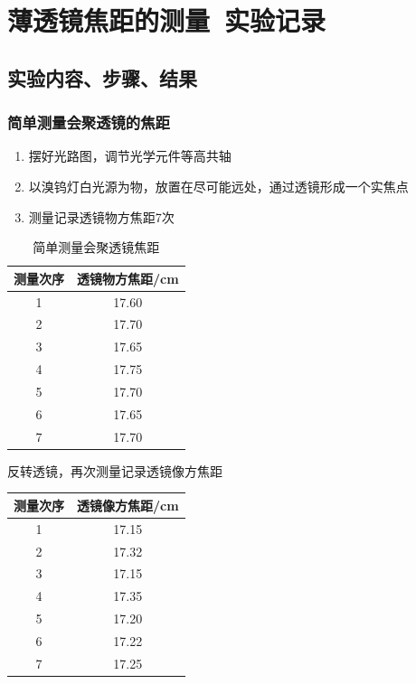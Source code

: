 \documentclass[dvipsnames, svgnames,a4paper,11pt]{article}
\begin{document}
\section{薄透镜焦距的测量\ \textbf{实验记录}}
\subsection{实验内容、步骤、结果}
\subsubsection{简单测量会聚透镜的焦距}
\begin{enumerate}
	\item 摆好光路图，调节光学元件等高共轴
	\item 以溴钨灯白光源为物，放置在尽可能远处，通过透镜形成一个实焦点
	\item 测量记录透镜物方焦距7次
\end{enumerate}
\begin{table}[H]
	\centering
	\caption{简单测量会聚透镜焦距}
	\begin{tabular}{cc}
		\toprule
		测量次序&透镜物方焦距/cm\\
		\midrule
		1&17.60\\
		2&17.70\\
		3&17.65\\
		4&17.75\\
		5&17.70\\
		6&17.65\\
		7&17.70\\
		\toprule
	\end{tabular}
\end{table}
反转透镜，再次测量记录透镜像方焦距
\begin{table}[H]
	\centering
	\begin{tabular}{cc}
		\toprule
		测量次序&透镜像方焦距/cm\\
		\midrule
		1&17.15\\
		2&17.32\\
		3&17.15\\
		4&17.35\\
		5&17.20\\
		6&17.22\\
		7&17.25\\
		\toprule
	\end{tabular}
\end{table}
\end{document}
